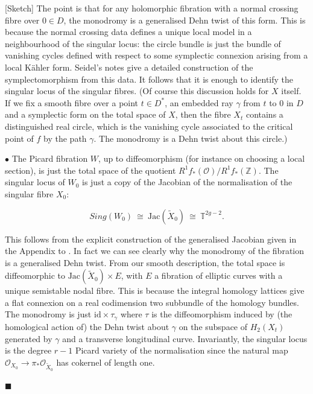 \documentclass[10pt]{article}
\newcommand{\zz}{\mathbb{Z}}
\newcommand{\rot}{\mathbb{T}}
\newcommand{\Jac}{\mathrm{Jac}}
\newenvironment{Pf}{\par \noindent{\sc Proof:} }{\quad $\blacksquare$ \par
\vspace{0.5cm}}
\begin{document}
\begin{Pf}[Sketch]  The point is that for any
  holomorphic fibration with a normal crossing fibre over $0 \in D$,
  the monodromy 
  is a generalised Dehn twist of this form.  This is because the
  normal crossing data defines a unique local model in a neighbourhood
  of the singular locus:  the circle bundle is just the bundle of
  vanishing cycles defined with respect to some symplectic connexion
  arising from a local K\"ahler form.  Seidel's notes give a detailed
  construction of the symplectomorphism from this data.  It follows
  that it is enough to identify the singular locus of the singular fibres. 
(Of course this discussion holds for $X$ itself.  If we fix a smooth fibre
over a point $t \in D^*$, an embedded ray $\gamma$ from $t$ to $0$
  in $D$ and a symplectic
form on the total space of $X$, then the fibre $X_t$ contains a
distinguished real circle, which is the vanishing cycle associated to
the critical point of $f$ by the path $\gamma$. The monodromy is a
  Dehn twist about this circle.)

\vspace{0.2cm}

\noindent $\bullet$ The Picard fibration $W$, up to diffeomorphism
(for instance on choosing a local section), is just the total space of
the quotient $R^1f_*(\mathcal{O}) / R^1f_*(\zz)$.  
The singular locus of $W_0$ is just a copy of the Jacobian of the
normalisation of the singular fibre $X_0$:  

$$Sing(W_0) \ \cong \ \Jac(\tilde{X}_0) \ \cong \ \rot^{2g-2}.$$

\noindent This follows from the explicit construction of the
generalised Jacobian given in the Appendix to \cite{SKDIS}.
In fact we can see clearly why
the monodromy of the fibration is a generalised Dehn twist.  From our
smooth description, the total space is
diffeomorphic to $\Jac(\tilde{X}_0) \times E$, with $E$ a fibration
of elliptic curves with a unique semistable nodal fibre.  This is
because the integral homology lattices give a flat connexion on a real
codimension two subbundle of the homology bundles.  The monodromy
is just $\mathrm{id} \times \tau_{\gamma}$ where $\tau$ is the
diffeomorphism induced by (the homological action of) the Dehn
twist about $\gamma$ on the subspace of $H_2(X_t)$ generated by $\gamma$
and a transverse longitudinal curve. 
Invariantly, the singular locus is the degree $r-1$ Picard variety of
the normalisation since the natural map $\mathcal{O}_{X_0} \rightarrow
\pi_* \mathcal{O}_{\tilde{X}_0}$ has cokernel of length one.


\end{Pf}
\end{document}
